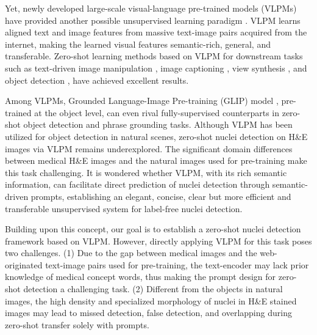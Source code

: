 \documentclass[runningheads]{llncs}
\begin{document}
Yet, newly developed large-scale visual-language pre-trained models (VLPMs) have provided another possible unsupervised learning paradigm \cite{radford2021learning,jia2021scaling}. VLPM learns aligned text and image features from massive text-image pairs acquired from the internet, making the learned visual features semantic-rich, general, and transferable. Zero-shot learning methods based on VLPM for downstream tasks such as text-driven image manipulation \cite{patashnik2021styleclip}, image captioning \cite{li2022blip}, view synthesis \cite{jain2021putting}, and object detection \cite{li2022grounded}, have achieved excellent results. 

Among VLPMs, Grounded Language-Image Pre-training (GLIP) model \cite{li2022grounded}, pre-trained at the object level, can even rival fully-supervised counterparts in zero-shot object detection and phrase grounding tasks. Although VLPM has been utilized for object detection in natural scenes, zero-shot nuclei detection on H\&E images via VLPM remains underexplored. The significant domain differences between medical H\&E images and the natural images used for pre-training make this task challenging. It is wondered whether VLPM, with its rich semantic information, can facilitate direct prediction of nuclei detection through semantic-driven prompts, establishing an elegant, concise, clear but more efficient and transferable unsupervised system for label-free nuclei detection. 


Building upon this concept, our goal is to establish a zero-shot nuclei detection framework based on VLPM. However, directly applying VLPM for this task poses two challenges. (1) Due to the gap between medical images and the web-originated text-image pairs used for pre-training, the text-encoder may lack prior knowledge of medical concept words, thus making the prompt design for zero-shot detection a challenging task. (2) Different from the objects in natural images, the high density and specialized morphology of nuclei in H\&E stained images may lead to missed detection, false detection, and overlapping during zero-shot transfer solely with prompts.
\end{document}

